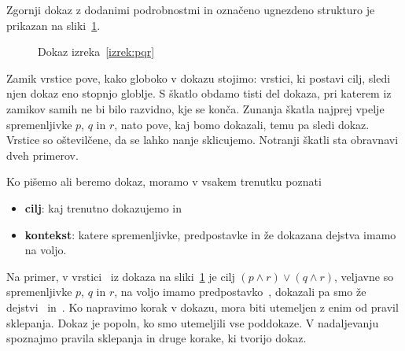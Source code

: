 \noindent
Zgornji dokaz z dodanimi podrobnostmi in označeno ugnezdeno strukturo je prikazan na sliki~\ref{fig:izrek-pqr}.
%
\begin{figure}[t]
  \centering
  \begin{boxedProof}[numbered]
  \begin{boxFrame}
    \begin{boxNested}[2]
    \end{boxNested}
    \begin{boxNested}[2]
    \end{boxNested}
  \end{boxFrame}
  \end{boxedProof}
  \caption{Dokaz izreka~\ref{izrek:pqr}}
  \label{fig:izrek-pqr}
\end{figure}
%
Zamik vrstice pove, kako globoko v dokazu stojimo: vrstici, ki postavi cilj, sledi njen dokaz eno stopnjo globlje. S škatlo obdamo tisti del dokaza, pri katerem iz zamikov samih ne bi bilo razvidno, kje se konča. Zunanja škatla najprej vpelje spremenljivke $p$, $q$ in $r$, nato pove, kaj bomo dokazali,
temu pa sledi dokaz. Vrstice so oštevilčene, da se lahko nanje sklicujemo. Notranji škatli sta obravnavi dveh primerov.

Ko pišemo ali beremo dokaz, moramo v vsakem trenutku poznati
%
\begin{itemize}
\item \textbf{cilj}: kaj trenutno dokazujemo in
\item \textbf{kontekst}: katere spremenljivke, predpostavke in že dokazana dejstva imamo na voljo.
\end{itemize}
%
Na primer, v vrstici~ iz dokaza na sliki~\ref{fig:izrek-pqr} je cilj $(p \land r) \lor (q \land r)$, veljavne so spremenljivke $p$, $q$ in $r$, na voljo imamo predpostavko~, dokazali pa smo že dejstvi~ in~.
%
Ko napravimo korak v dokazu, mora biti utemeljen z enim od pravil sklepanja. Dokaz je
popoln, ko smo utemeljili vse poddokaze.
%
V nadaljevanju spoznajmo pravila sklepanja in druge korake, ki tvorijo dokaz.

